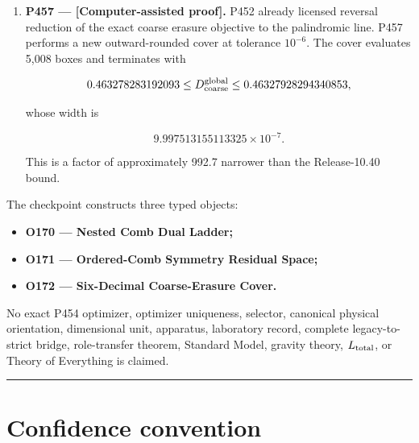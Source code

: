 \documentclass[11pt,a4paper,openany]{report}
\begin{document}
\begin{enumerate}
\item 
\textbf{P457 --- \textcolor{fingreen}{[Computer-assisted proof]}.} P452 already licensed reversal reduction of the exact coarse erasure objective to the palindromic line. P457 performs a new outward-rounded cover at tolerance \(10^{-6}\). The cover evaluates 5,008 boxes and terminates with

\[
   0.463278283192093
   \le D_{\rm coarse}^{\rm global}
   \le0.46327928294340853,
   \]

whose width is

\[
   9.997513155113325\times10^{-7}.
   \]

This is a factor of approximately 992.7 narrower than the Release-10.40 bound.

\end{enumerate}

The checkpoint constructs three typed objects:

\begin{itemize}
\item 
\textbf{O170 --- Nested Comb Dual Ladder;}

\item 
\textbf{O171 --- Ordered-Comb Symmetry Residual Space;}

\item 
\textbf{O172 --- Six-Decimal Coarse-Erasure Cover.}

\end{itemize}

No exact P454 optimizer, optimizer uniqueness, selector, canonical physical orientation, dimensional unit, apparatus, laboratory record, complete legacy-to-strict bridge, role-transfer theorem, Standard Model, gravity theory, \(L_{\rm total}\), or Theory of Everything is claimed.

\par\medskip\hrule\medskip

\chapter{Confidence convention}
\end{document}
